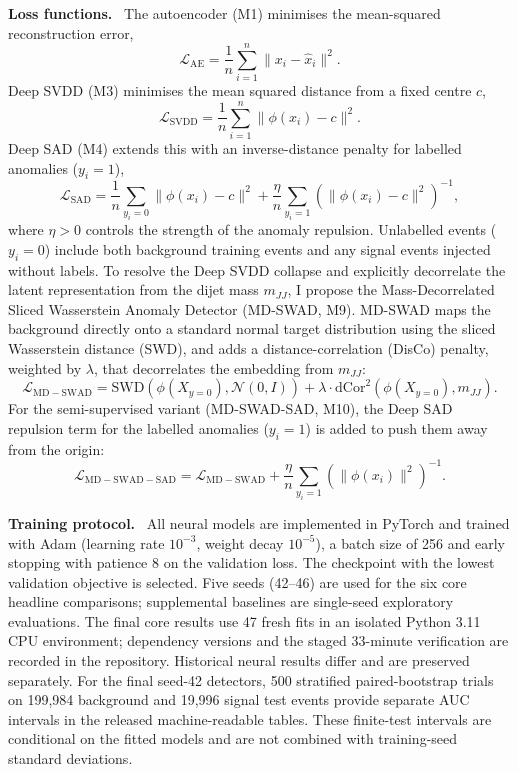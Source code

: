 \documentclass[11pt,a4paper]{article}
\newcommand{\runin}[1]{\par\vspace{2pt}\textbf{#1.}\ }
\newcommand{\mjj}{m_{JJ}}
\begin{document}
\runin{Loss functions}
The autoencoder (M1) minimises the mean-squared reconstruction error,
\begin{equation}
\mathcal{L}_{\mathrm{AE}} = \frac{1}{n}\sum_{i=1}^n \|x_i - \hat{x}_i\|^2 .
\end{equation}
Deep SVDD\cite{Ruff2018} (M3) minimises the mean squared distance from a
fixed centre $c$,
\begin{equation}
\mathcal{L}_{\mathrm{SVDD}} = \frac{1}{n}\sum_{i=1}^n \|\phi(x_i) - c\|^2 .
\end{equation}
Deep SAD\cite{Ruff2020} (M4) extends this with an inverse-distance
penalty for labelled anomalies ($y_i = 1$),
\begin{equation}
\mathcal{L}_{\mathrm{SAD}} = \frac{1}{n}\sum_{y_i=0}\|\phi(x_i)-c\|^2
  + \frac{\eta}{n}\sum_{y_i=1}\left(\|\phi(x_i)-c\|^2\right)^{-1},
\label{eq:sad}
\end{equation}
where $\eta > 0$ controls the strength of the anomaly repulsion. Unlabelled
events ($y_i = 0$) include both background training events and any
signal events injected without labels.
To resolve the Deep SVDD collapse and explicitly decorrelate the latent representation from the dijet mass $\mjj$, I propose the Mass-Decorrelated Sliced Wasserstein Anomaly Detector (MD-SWAD, M9). MD-SWAD maps the background directly onto a standard normal target distribution using the sliced Wasserstein distance (SWD),\cite{Bonneel2015,Kolouri2019} and adds a distance-correlation (DisCo) penalty\cite{Kasieczka2020,Szekely2007}, weighted by $\lambda$, that decorrelates the embedding from $\mjj$:
\begin{equation}
\mathcal{L}_{\mathrm{MD-SWAD}} = \mathrm{SWD}(\phi(X_{y=0}), \mathcal{N}(0, I)) + \lambda \cdot \mathrm{dCor}^2(\phi(X_{y=0}), \mjj).
\end{equation}
For the semi-supervised variant (MD-SWAD-SAD, M10), the Deep SAD repulsion term for the labelled anomalies ($y_i = 1$) is added to push them away from the origin:
\begin{equation}
\mathcal{L}_{\mathrm{MD-SWAD-SAD}} = \mathcal{L}_{\mathrm{MD-SWAD}} + \frac{\eta}{n}\sum_{y_i=1}\left(\|\phi(x_i)\|^2\right)^{-1}.
\end{equation}

\runin{Training protocol}
All neural models are implemented in PyTorch\cite{Paszke2019} and trained with Adam\cite{Kingma2015}
(learning rate $10^{-3}$, weight decay $10^{-5}$), a batch size of 256 and
early stopping with patience 8 on the validation loss. The checkpoint
with the lowest validation objective is selected. Five seeds
(42--46) are used for the six core headline comparisons;
supplemental baselines are single-seed exploratory evaluations.
The final core results use 47 fresh fits in an isolated Python 3.11 CPU environment;
dependency versions and the staged 33-minute verification are recorded in the repository.
Historical neural results differ and are preserved separately. For the final seed-42
detectors, 500 stratified paired-bootstrap trials on 199,984 background and 19,996
signal test events provide separate AUC intervals in the released machine-readable
tables. These finite-test intervals are conditional on the fitted models and are
not combined with training-seed standard deviations.
\end{document}
